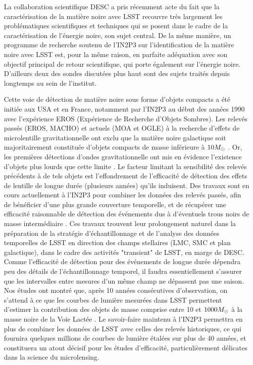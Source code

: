 \documentclass[12pt]{article}
\begin{document}
La collaboration scientifique DESC a pris récemment acte du fait que la caractérisation de la matière noire avec LSST recouvre très largement les problématiques scientifiques et techniques qui se posent dans le cadre de la caractérisation de l'énergie noire, son sujet central.
De la même manière, un programme de recherche soutenu de l'IN2P3 sur l'identification de la matière noire avec LSST est, pour la même raison, en parfaite adéquation avec son objectif principal de retour scientifique, qui porte également sur l'énergie noire. D'ailleurs deux des sondes discutées plus haut sont des sujets traités depuis longtemps au sein de l'institut.

Cette voie de détection de matière noire sous forme d'objets compacts a été initiée aux USA et en France, notamment par l'IN2P3 au début des
années 1990 avec l'expérience EROS (Expérience de Recherche d'Objets Sombres).
Les relevés passés (EROS, MACHO) et actuels (MOA et OGLE) à la recherche d'effets de microlentille gravitationnelle ont exclu que la matière noire galactique soit majoritairement constituée d'objets compacts de masse inférieure à $10M_\odot$ \citep{Tisserand2007,OGLE2010}. Or, les premières détections d'ondes gravitationnelle ont mis en évidence l'existence d'objets plus lourds que cette limite \citep{GW1,Bird}.
Le facteur limitant la sensibilité des relevés précédents à de tels objets est l'effondrement de
l'efficacité de détection des effets de lentille de longue durée (plusieurs années) qu'ils induisent.
Des travaux sont en cours actuellement à l'IN2P3 pour combiner les données des relevés passés, afin de bénéficier d'une plus grande couverture temporelle, et
de récupérer une efficacité raisonnable de détection des événements dus à d'éventuels trous noirs de masse intermédiaire \citep{MEMO}.
Ces travaux trouvent leur prolongement naturel dans la préparation de la stratégie d'échantillonnage et de
l'analyse des données temporelles de LSST en direction des champs stellaires (LMC, SMC et plan galactique), dans le cadre
des activités "transient" de LSST, en marge de DESC.
Comme l'efficacité de détection pour des événements de longue durée dépendra peu des détails de l'échantillonnage temporel, il faudra essentiellement
s'assurer que les intervalles entre mesures d'un même champ ne dépassent pas une saison. Nos études ont montré que,
après 10 années consécutives d'observation, on s'attend à ce que
les courbes de lumière mesurées dans LSST permettent d'estimer la contribution des objets de masse comprise entre
10 et $1000M_\odot$ à la masse noire de la Voie Lactée \citep{MEMO}. Le savoir-faire maintenu à l'IN2P3 permettra en plus
de combiner les données de LSST avec celles des relevés historiques, ce qui fournira quelques millions de courbes de lumière
étalées sur plus de 40 années, et constituera un atout décisif pour les études d'efficacité, particulièrement délicates dans
la science du microlensing.
\end{document}
